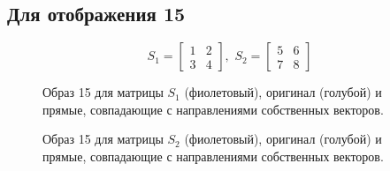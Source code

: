 \documentclass[a5paper, 10pt]{article}
\theoremstyle{definition}
\theoremstyle{plain}
\theoremstyle{remark}
\begin{document}
\newpage
\subsection{Для отображения 15}
\begin{equation}
S_1 =
\begin{bmatrix}
1 & 2\\
3 & 4
\end{bmatrix}
, \, \, 
S_2 =
\begin{bmatrix}
5 & 6\\
7 & 8
\end{bmatrix}
\end{equation}

\begin{figure}[h!]
\caption{Образ 15 для матрицы $S_1$ (фиолетовый), оригинал (голубой) и прямые, совпадающие с направлениями собственных векторов.}
\end{figure}

\newpage
\begin{figure}[h!]
\caption{Образ 15 для матрицы $S_2$ (фиолетовый), оригинал (голубой) и прямые, совпадающие с направлениями собственных векторов.}
\end{figure}
\end{document}
